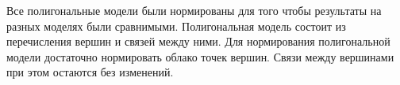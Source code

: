 \clearpage
Все полигональные модели были нормированы для того чтобы результаты на разных моделях были сравнимыми. Полигональная модель состоит из перечисления вершин и связей между ними. Для нормирования полигональной модели достаточно нормировать облако точек вершин. Связи между вершинами при этом остаются без изменений.

\begin{figure}[h]
    \centering

\end{figure}
